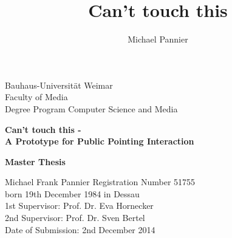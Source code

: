 
\begin{titlepage}
\large
\noindent
Bauhaus-Universität Weimar\\
Faculty of Media\\
Degree Program Computer Science and Media\\
\author{Michael Pannier}
\title{Can't touch this}
\vspace{20mm}
\begin{center}
    \huge{\bfseries{Can't touch this -\\
		A Prototype for Public Pointing Interaction}}
\end{center}
\vspace{15mm}
\begin{center}
    \huge{\bfseries{Master Thesis}}\\
\end{center}
\vspace{20mm}
Michael Frank Pannier
\hfill Registration Number 51755\\
born 19th December 1984 in Dessau\\
\newline
\newline
1st Supervisor: Prof. Dr. Eva Hornecker\\
2nd Supervisor: Prof. Dr. Sven Bertel\\
\vfil
\noindent
Date of Submission: 2nd December 2014\\
\end{titlepage}
